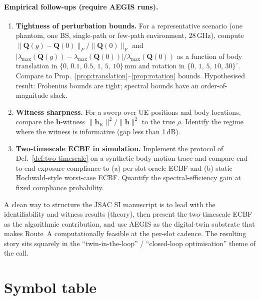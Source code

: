 \documentclass[11pt,a4paper]{article}
\theoremstyle{definition}
\newcommand{\hh}{\mathbf{h}}
\newcommand{\Q}{\mathbf{Q}}
\newcommand{\lammax}{\lambda_{\max}}
\begin{document}
\paragraph{Empirical follow-ups (require AEGIS runs).}
\begin{enumerate}[leftmargin=2em,itemsep=2pt,start=5]
\item \textbf{Tightness of perturbation bounds.}
      For a representative scenario (one phantom, one BS, single-path or
      few-path environment, $28\,$GHz), compute
      $\|\Q(g)-\Q(0)\|_F/\|\Q(0)\|_F$ and
      $|\lammax(\Q(g))-\lammax(\Q(0))|/\lammax(\Q(0))$
      as a function of body translation in $\{0,\,0.1,\,0.5,\,1,\,5,\,10\}\,$mm
      and rotation in $\{0,\,1,\,5,\,10,\,30\}^\circ$. Compare to
      Prop.~\ref{prop:translation}--\ref{prop:rotation} bounds.
      Hypothesised result: Frobenius bounds are tight; spectral bounds
      have an order-of-magnitude slack.
\item \textbf{Witness sharpness.}
      For a sweep over UE positions and body locations, compare the
      $\hh$-witness $\|\hh_K\|^2/\|\hh\|^2$ to the true $\rho$. Identify
      the regime where the witness is informative (gap less than 1\,dB).
\item \textbf{Two-timescale ECBF in simulation.}
      Implement the protocol of Def.~\ref{def:two-timescale} on a
      synthetic body-motion trace and compare end-to-end exposure
      compliance to (a) per-slot oracle ECBF and (b) static
      Hochwald-style worst-case ECBF. Quantify the spectral-efficiency
      gain at fixed compliance probability.
\end{enumerate}

A clean way to structure the JSAC SI manuscript is to lead with the
identifiability and witness results (theory), then present the
two-timescale ECBF as the algorithmic contribution, and use AEGIS as
the digital-twin substrate that makes Route~A computationally feasible
at the per-slot cadence. The resulting story sits squarely in the
``twin-in-the-loop'' / ``closed-loop optimisation'' theme of the call.

\appendix

\section{Symbol table}
\label{app:symbols}
\end{document}
